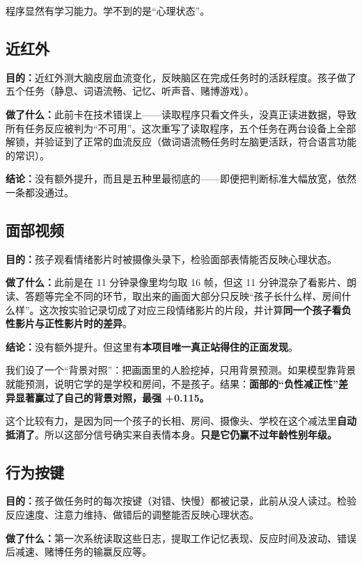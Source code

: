 \documentclass[UTF8,12pt,a4paper]{ctexart}
\newcommand{\key}[1]{\textbf{\textcolor{blue!45!black}{#1}}}
\begin{document}
\noindent 程序显然有学习能力。学不到的是“心理状态”。

\subsection{近红外}

\key{目的：}近红外测大脑皮层血流变化，反映脑区在完成任务时的活跃程度。孩子做了五个任务（静息、词语流畅、记忆、听声音、赌博游戏）。

\key{做了什么：}此前卡在技术错误上——读取程序只看文件头，没真正读进数据，导致所有任务反应被判为“不可用”。这次重写了读取程序，五个任务在两台设备上全部解锁，并验证到了正常的血流反应（做词语流畅任务时左脑更活跃，符合语言功能的常识）。

\key{结论：}没有额外提升，而且是五种里最彻底的——即便把判断标准大幅放宽，依然一条都没通过。

\subsection{面部视频}

\key{目的：}孩子观看情绪影片时被摄像头录下，检验面部表情能否反映心理状态。

\key{做了什么：}此前是在 11 分钟录像里均匀取 16 帧，但这 11 分钟混杂了看影片、朗读、答题等完全不同的环节，取出来的画面大部分只反映“孩子长什么样、房间什么样”。这次按实验记录切成了对应三段情绪影片的片段，并计算\key{同一个孩子看负性影片与正性影片时的差异}。

\key{结论：}没有额外提升。但这里有\key{本项目唯一真正站得住的正面发现}。

我们设了一个“背景对照”：把画面里的人脸挖掉，只用背景预测。如果模型靠背景就能预测，说明它学的是学校和房间，不是孩子。结果：\key{面部的“负性减正性”差异显著赢过了自己的背景对照，最强 +0.115。}

这个比较有力，是因为同一个孩子的长相、房间、摄像头、学校在这个减法里\key{自动抵消了}。所以这部分信号确实来自表情本身。\key{只是它仍赢不过年龄性别年级。}

\subsection{行为按键}

\key{目的：}孩子做任务时的每次按键（对错、快慢）都被记录，此前从没人读过。检验反应速度、注意力维持、做错后的调整能否反映心理状态。

\key{做了什么：}第一次系统读取这些日志，提取工作记忆表现、反应时间及波动、错误后减速、赌博任务的输赢反应等。
\end{document}
